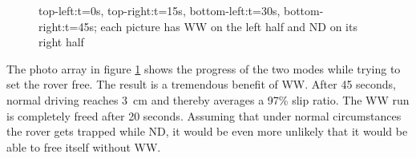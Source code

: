 \documentclass[a4paper,twocolumn]{esapub2005} %
\begin{document}
\begin{figure}[h!]
    \centering	
        \caption{top-left:t=0s,  top-right:t=15s, bottom-left:t=30s,
        bottom-right:t=45s; each picture has WW on the left half and
        ND on its right half }
    \label{fig:volleysequence}
\end{figure}

The photo array in figure \ref{fig:volleysequence} shows the progress of the
two modes while trying to set the rover free.
The result is a tremendous benefit of WW. After 45 seconds, normal
driving reaches 3~\unit{cm} and thereby averages a 97\% slip ratio. The WW
run is completely freed after 20 seconds. Assuming that under normal
circumstances the rover gets trapped while ND, it would be even
more unlikely that it would be able to free itself without WW.
\end{document}

